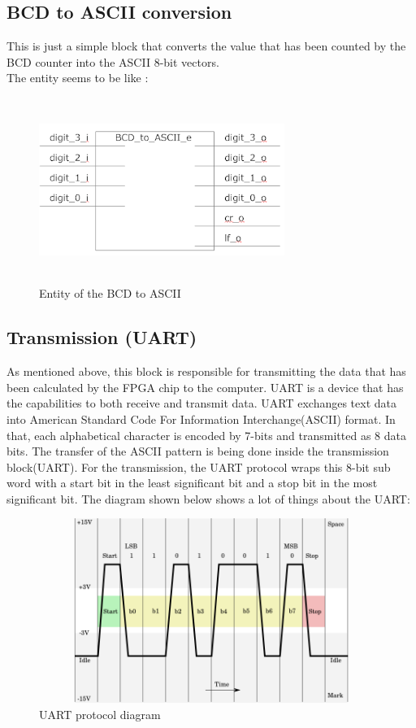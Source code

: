 \documentclass[12pt,a4paper]{article}
\begin{document}
\subsection{BCD to ASCII conversion}
This is just a simple block that converts the value that has been counted by the BCD counter into the ASCII 8-bit vectors.\\ 

The entity seems to be like :\\
\begin{figure}[H]
\centering
\includegraphics[width=8cm,height=6cm]{bcdAscii.PNG}
\caption{Entity of the BCD to ASCII }
\label{Entity of the BCD to ASCII }
\end{figure}

\subsection{Transmission (UART)}
As mentioned above, this block is responsible for transmitting the data that has been calculated by the FPGA chip to the computer. UART is a device that has the capabilities to both receive and transmit data. UART exchanges text data into American Standard Code For Information Interchange(ASCII)  format. In that, each alphabetical character is encoded by 7-bits and transmitted as 8 data bits. The transfer of the ASCII pattern is being done inside the transmission block(UART). For the transmission, the UART protocol wraps this 8-bit sub word with a start bit in the least significant bit and a stop bit in the most significant bit. The diagram shown below shows a lot of things about the UART:\\


\begin{figure}[H]
\centering
\includegraphics[width=16cm,height=6cm]{UARTprotocol.png}
\caption{UART protocol diagram}
\label{UART protocol diagram}
\end{figure}
\end{document}
